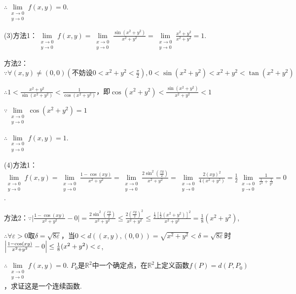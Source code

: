 \documentclass[12pt,UTF8]{ctexart}
\begin{document}
\begin{enumerate}
$\therefore\lim\limits_{\substack{x\rightarrow0\\ y\rightarrow0}}f(x,y)=0$.

(3)方法1：$\lim\limits_{\substack{x\rightarrow0\\ y\rightarrow0}}f(x,y)=\lim\limits_{\substack{x\rightarrow0\\ y\rightarrow0}}\frac{\sin(x^2+y^2)}{x^2+y^2}=\lim\limits_{\substack{x\rightarrow0\\ y\rightarrow0}}\frac{x^2+y^2}{x^2+y^2}=1$.

方法2：$\because\forall(x,y)\neq(0,0)(\text{不妨设$0<x^2+y^2<\frac\pi2$}),0<\sin(x^2+y^2)<x^2+y^2<\tan(x^2+y^2)$

$\therefore1<\frac{x^2+y^2}{\sin(x^2+y^2)}<\frac1{\cos(x^2+y^2)}$，即$\cos(x^2+y^2)<\frac{\sin(x^2+y^2)}{x^2+y^2}<1$

$\because\lim\limits_{\substack{x\rightarrow0\\ y\rightarrow0}}\cos(x^2+y^2)=1$

$\therefore\lim\limits_{\substack{x\rightarrow0\\ y\rightarrow0}}f(x,y)=1$.

(4)方法1：$\lim\limits_{\substack{x\rightarrow0\\ y\rightarrow0}}f(x,y)=\lim\limits_{\substack{x\rightarrow0\\ y\rightarrow0}}\frac{1-\cos(xy)}{x^2+y^2}=\lim\limits_{\substack{x\rightarrow0\\ y\rightarrow0}}\frac{2\sin^2(\frac{xy}2)}{x^2+y^2}=\lim\limits_{\substack{x\rightarrow0\\ y\rightarrow0}}\frac{2(xy)^2}{4(x^2+y^2)}=\frac12\lim\limits_{\substack{x\rightarrow0\\ y\rightarrow0}}\frac1{\frac1{x^2}+\frac1{y^2}}=0$.

方法2：$\because\Big|\frac{1-\cos(xy)}{x^2+y^2}-0\Big|=\frac{2\sin^2(\frac{xy}2)}{x^2+y^2}\leq\frac{2(\frac{xy}2)^2}{x^2+y^2}\leq\frac{\frac12[\frac12(x^2+y^2)]^2}{x^2+y^2}=\frac18(x^2+y^2)$,

$\therefore\forall\varepsilon>0$取$\delta=\sqrt{8\varepsilon}$，当$0<d((x,y),(0,0))=\sqrt{x^2+y^2}<\delta=\sqrt{8\varepsilon}$时$\Big|\frac{1-\cos(xy)}{x^2+y^2}-0\Big|\\
\leq\frac18(x^2+y^2)<\varepsilon$,

$\therefore\lim\limits_{\substack{x\rightarrow0\\ y\rightarrow0}}f(x,y)=0$.
$P_0$是$\mathbb R^2$中一个确定点，在$\mathbb R^2$上定义函数$f(P)=d(P,P_0)$，求证这是一个连续函数.


\end{enumerate}
\end{document}
